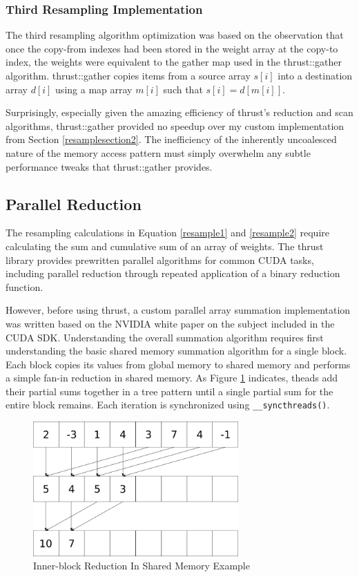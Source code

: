 \documentclass{article}
\begin{document}
\subsubsection{Third Resampling Implementation}
The third resampling algorithm optimization was based on the observation that once the copy-from indexes had been stored in the weight array at the copy-to index, the weights were equivalent to the gather map used in the thrust::gather algorithm. \cite{thrust} thrust::gather copies items from a source array \(s[i]\) into a destination array \(d[i]\) using a map array \(m[i]\) such that \(s[i]=d[m[i]]\).

Surprisingly, especially given the amazing efficiency of thrust's reduction and scan algorithms, thrust::gather provided no speedup over my custom implementation from Section \ref{resamplesection2}. The inefficiency of the inherently uncoalesced nature of the memory access pattern must simply overwhelm any subtle performance tweaks that thrust::gather provides.

\subsection{Parallel Reduction}
The resampling calculations in Equation \ref{resample1} and \ref{resample2} require calculating the sum and cumulative sum of an array of weights. The thrust library provides prewritten parallel algorithms for common CUDA tasks, including parallel reduction through repeated application of a binary reduction function.\cite{thrust}

However, before using thrust, a custom parallel array summation implementation was written based on the NVIDIA white paper on the subject included in the CUDA SDK.\cite{oprc} Understanding the overall summation algorithm requires first understanding the basic shared memory summation algorithm for a single block. Each block copies its values from global memory to shared memory and performs a simple fan-in reduction in shared memory. As Figure \ref{sum1} indicates, theads add their partial sums together in a tree pattern until a single partial sum for the entire block remains. Each iteration is synchronized using \verb!__syncthreads()!.

\begin{figure}
\centering
\includegraphics[width=0.7\textwidth]{data/summation.png}
\caption{Inner-block Reduction In Shared Memory Example}
\label{sum1}
\end{figure}
\end{document}
